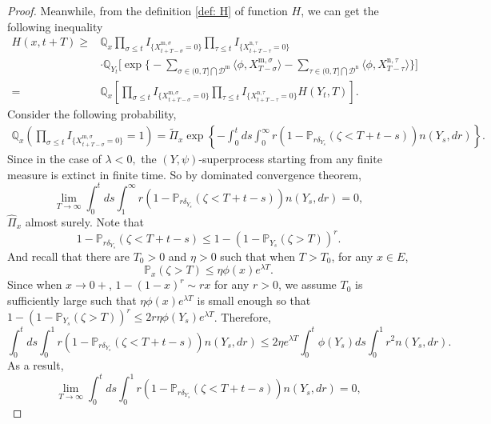 \documentclass[12pt,a4paper]{amsart}
\numberwithin{equation}{section}
\theoremstyle{plain}
\theoremstyle{definition}
\theoremstyle{remark}
\begin{document}
\begin{proof}
Meanwhile, from the definition
\eqref{def: H} of function $H$, we can get the following inequality
\begin{equation}\label{subsub}
\begin{aligned}
     H(x,t+T)\geq& \mathbb Q_{x}\prod_{\sigma\leq t}I_{\{ X_{t+T-\sigma}^{{\mathrm m},\sigma}=0\}}\prod_{\tau\leq t}I_{\{ X_{t+T-\tau}^{{\mathrm n},\tau}=0\}}\\
&\cdot\mathbb Q_{Y_t}\Big[\exp\Big\{-\sum_{\sigma\in (0, T]\bigcap \mathcal D^{\mathrm m}}\langle \phi, X_{T-\sigma}^{{\mathrm m},\sigma}\rangle -\sum_{\tau\in (0, T]\bigcap \mathcal D^{\mathrm n}}\langle \phi, X_{T-\tau}^{{\mathrm n},\tau}\rangle \Big\}\Big]\\
=& \mathbb Q_{x}\left[\prod_{\sigma\leq t}I_{\{ X_{t+T-\sigma}^{{\mathrm m},\sigma}=0\}}\prod_{\tau\leq t}I_{\{ X_{t+T-\tau}^{{\mathrm n},\tau}=0\}}H(Y_t, T)\right].
\end{aligned}
\end{equation}
Consider the following probability,
\begin{eqnarray*}
\mathbb Q_{x}\left(\prod_{\sigma\leq t}I_{\{ X_{t+T-\sigma}^{{\mathrm m},\sigma}=0\}}=1\right)
=\widetilde\Pi_x\exp\left\{-\int_0^tds\int_0^\infty r(1-\mathbb P_{r\delta_{Y_s}}(\zeta<T+t-s))n(Y_s,dr)\right\}.
\end{eqnarray*}
Since in the case of $\lambda<0,$ the $(Y,\psi)$-superprocess starting from any finite measure is extinct in
finite time.  So by dominated convergence theorem,
\begin{equation}\label{1infty limit}
\lim_{T\rightarrow\infty}\int_0^tds\int_1^\infty r(1-\mathbb P_{r\delta_{Y_s}}(\zeta<T+t-s))n(Y_s,dr)=0,
\end{equation}
$\widehat\Pi_x$ almost surely.   Note that
\[
1-\mathbb P_{r\delta_{Y_s}}(\zeta<T+t-s)\leq 1-(1-\mathbb P_{Y_s}(\zeta>T))^r.
\]
And recall that there are $T_0>0$ and $\eta>0$ such that when $T>T_0$, for any $x\in E$,
\[
\mathbb P_x(\zeta>T)\leq \eta \phi(x)e^{\lambda T}.
\]
Since when $x\rightarrow 0+$, $1-(1-x)^r\sim rx$ for any $r>0$, we assume $T_0$ is sufficiently large such that
$\eta \phi(x)e^{\lambda T}$ is small enough so that $1-(1-\mathbb P_{Y_s}(\zeta>T))^r\leq 2r\eta \phi(Y_s)e^{\lambda T}$.
Therefore,
\[
\int_0^tds\int_0^1 r(1-\mathbb P_{r\delta_{ Y_s}}(\zeta<T+t-s))n(Y_s,dr)\leq 2\eta e^{\lambda T}\int_0^t\phi(Y_s)ds\int_0^1 r^2 n(Y_s,dr).
\]
As a result,
\begin{equation}\label{01limit}
\lim_{T\rightarrow\infty}\int_0^tds\int_0^1 r(1-\mathbb P_{r\delta_{Y_s}}(\zeta<T+t-s))n(Y_s,dr)=0,

\end{equation}
\end{proof}
\end{document}
